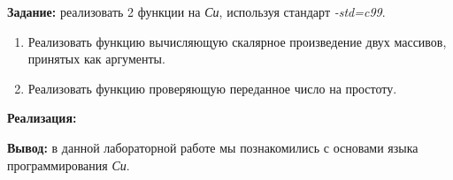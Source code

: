 \documentclass[12pt, a4paper]{article}
\begin{document}


\textbf{Задание:} реализовать 2 функции на \textit{Си}, используя стандарт
\textit{-std=c99}.
\begin{enumerate}
\item Реализовать функцию вычисляющую скалярное произведение двух
массивов, принятых как аргументы.
\item Реализовать функцию проверяющую переданное число на простоту.
\end{enumerate}

\textbf{Реализация:}



\textbf{Вывод:} в данной лабораторной работе мы познакомились с основами
языка программирования \textit{Си}.
\end{document}
